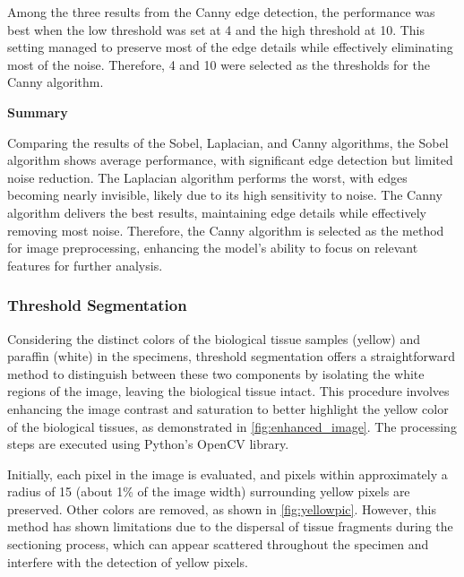 Among the three results from the Canny edge detection, the performance was best when the low threshold was set at 4 and the high threshold at 10. This setting managed to preserve most of the edge details while effectively eliminating most of the noise. Therefore, 4 and 10 were selected as the thresholds for the Canny algorithm.

\textbf{Summary}

Comparing the results of the Sobel, Laplacian, and Canny algorithms, the Sobel algorithm shows average performance, with significant edge detection but limited noise reduction. The Laplacian algorithm performs the worst, with edges becoming nearly invisible, likely due to its high sensitivity to noise. The Canny algorithm delivers the best results, maintaining edge details while effectively removing most noise. Therefore, the Canny algorithm is selected as the method for image preprocessing, enhancing the model's ability to focus on relevant features for further analysis.

\subsubsection{Threshold Segmentation}

Considering the distinct colors of the biological tissue samples (yellow) and paraffin (white) in the specimens, threshold segmentation offers a straightforward method to distinguish between these two components by isolating the white regions of the image, leaving the biological tissue intact. This procedure involves enhancing the image contrast and saturation to better highlight the yellow color of the biological tissues, as demonstrated in \autoref{fig:enhanced_image}. The processing steps are executed using Python's OpenCV library.

Initially, each pixel in the image is evaluated, and pixels within approximately a radius of 15 (about 1\% of the image width) surrounding yellow pixels are preserved. Other colors are removed, as shown in \autoref{fig:yellowpic}. However, this method has shown limitations due to the dispersal of tissue fragments during the sectioning process, which can appear scattered throughout the specimen and interfere with the detection of yellow pixels.


